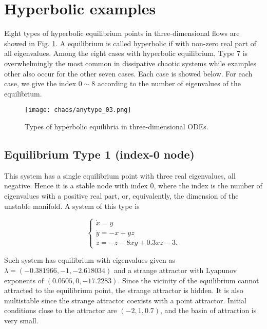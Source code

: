 \section{Hyperbolic examples}

Eight types of hyperbolic equilibrium points in three-dimensional flows are showed
in Fig. \ref{fig:anytype_03}. A equilibrium is called hyperbolic if with non-zero
real part of all eigenvalues. Among the eight cases with hyperbolic equilibrium,
Type 7 is overwhelmingly the most common in dissipative chaotic systems while examples
other also occur for the other seven cases. Each case is showed below.
For each case, we give the index $0\sim 8$ according to the number of eigenvalues of the
equilibrium.

\begin{figure}[htbp]
\centering
\texttt{[image: chaos/anytype\_03.png]}
\caption{\label{fig:anytype_03}
 Types of hyperbolic equilibria in three-dimensional ODEs.}
\end{figure}

\subsection{Equilibrium Type 1 (index-0 node)}

This system has a single equilibrium point with three real eigenvalues, all negative.
Hence it is a stable node with index 0, where the index is the number of eigenvalues
with a positive real part, or, equivalently, the dimension of the unstable manifold.
A system of this type is

\begin{equation}
\label{eq:anytype_equi_05}
\left\{
    \begin{array}{l}
      \dot{x} = y \\
      \dot{y} = -x+yz \\
      \dot{z} = −z − 8xy + 0.3xz − 3.
    \end{array}
  \right.
\end{equation}

Such system has equilibrium with eigenvalues given as $\lambda = (−0.381966, −1, −2.618034)$ and
a strange attractor with Lyapunov exponents of $(0.0505, 0, −17.2283)$.
Since the vicinity of the equilibrium cannot attracted to the equilibrium point,
the strange attractor  is hidden.
It is also multistable since the strange attractor
coexists with a point attractor. Initial conditions close to the attractor are $(−2, 1, 0.7)$,
and the basin of attraction is very small.

